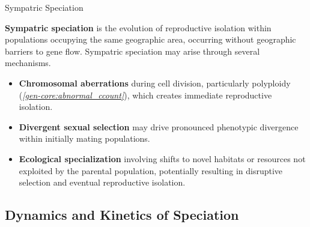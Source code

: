 \documentclass[10pt]{article}
\begin{document}
    \begin{core}{Sympatric Speciation}

      \textbf{Sympatric speciation} is the evolution of reproductive isolation within populations occupying the same geographic area, occurring without geographic barriers to gene flow. Sympatric speciation may arise through several mechanisms.

      \begin{itemize}

        \item \textbf{Chromosomal aberrations} during cell division, particularly polyploidy (\textit{\autoref{gen-core:abnormal_ccount}}), which creates immediate reproductive isolation.

        \item \textbf{Divergent sexual selection} may drive pronounced phenotypic divergence within initially mating populations.

        \item \textbf{Ecological specialization} involving shifts to novel habitats or resources not exploited by the parental population, potentially resulting in disruptive selection and eventual reproductive isolation.

      \end{itemize}

    \end{core}

  \subsection{Dynamics and Kinetics of Speciation}
\end{document}
